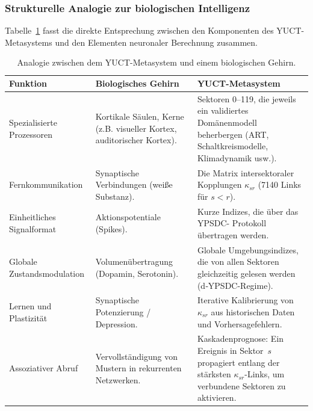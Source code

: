 \documentclass[13pt,a4paper]{article}
\begin{document}
	\subsubsection*{Strukturelle Analogie zur biologischen Intelligenz}
	Tabelle~\ref{tab:brain-analogy} fasst die direkte Entsprechung zwischen den
	Komponenten des YUCT-Metasystems und den Elementen neuronaler Berechnung zusammen.
	
	\begin{table}[htbp]
		\centering
		\caption{Analogie zwischen dem YUCT-Metasystem und einem biologischen Gehirn.}
		\label{tab:brain-analogy}
		\small
		\begin{tabular}{p{3.5cm}p{5.5cm}p{5.5cm}}
			\toprule
			\textbf{Funktion} & \textbf{Biologisches Gehirn} & \textbf{YUCT-Metasystem} \\
			\midrule
			Spezialisierte Prozessoren &
			Kortikale Säulen, Kerne (z.B. visueller Kortex, auditorischer Kortex). &
			Sektoren 0--119, die jeweils ein validiertes Domänenmodell beherbergen (ART, Schaltkreismodelle, Klimadynamik usw.). \\
			\midrule
			Fernkommunikation &
			Synaptische Verbindungen (weiße Substanz). &
			Die Matrix intersektoraler Kopplungen
			\(\kappa_{sr}\) (7140 Links für \(s<r\)). \\
			\midrule
			Einheitliches Signalformat &
			Aktionspotentiale (Spikes). &
			Kurze Indizes, die über das YPSDC-
			Protokoll übertragen werden. \\
			\midrule
			Globale Zustandsmodulation &
			Volumenübertragung (Dopamin, Serotonin). &
			Globale Umgebungsindizes, die von allen
			Sektoren gleichzeitig gelesen werden (d‑YPSDC-Regime). \\
			\midrule
			Lernen und Plastizität &
			Synaptische Potenzierung / Depression. &
			Iterative Kalibrierung von \(\kappa_{sr}\) aus
			historischen Daten und Vorhersagefehlern. \\
			\midrule
			Assoziativer Abruf &
			Vervollständigung von Mustern in rekurrenten Netzwerken. &
			Kaskadenprognose: Ein Ereignis in Sektor~\(s\)
			propagiert entlang der stärksten
			\(\kappa_{sr}\)-Links, um verbundene Sektoren zu aktivieren. \\
			\bottomrule
		\end{tabular}
	\end{table}
	
\end{document}
